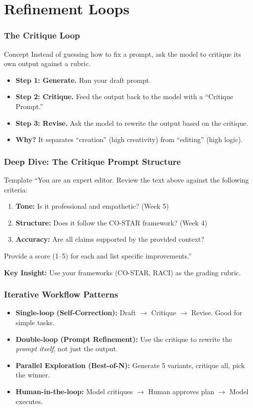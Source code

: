 \documentclass{beamer}
\begin{document}
\section{Refinement Loops}

\begin{frame}
    \frametitle{The Critique Loop}
    \begin{block}{Concept}
        Instead of guessing how to fix a prompt, ask the model to critique its own output against a rubric.
    \end{block}
    \begin{itemize}
        \item \textbf{Step 1: Generate.} Run your draft prompt.
        \item \textbf{Step 2: Critique.} Feed the output back to the model with a ``Critique Prompt.''
        \item \textbf{Step 3: Revise.} Ask the model to rewrite the output based on the critique.
        \item \textbf{Why?} It separates ``creation'' (high creativity) from ``editing'' (high logic).
    \end{itemize}
\end{frame}

\begin{frame}[fragile]
    \frametitle{Deep Dive: The Critique Prompt Structure}
    \begin{block}{Template}
        \small
        ``You are an expert editor. Review the text above against the following criteria:
        \begin{enumerate}
            \item \textbf{Tone:} Is it professional and empathetic? (Week 5)
            \item \textbf{Structure:} Does it follow the CO-STAR framework? (Week 4)
            \item \textbf{Accuracy:} Are all claims supported by the provided context?
        \end{enumerate}
        Provide a score (1--5) for each and list specific improvements.''
    \end{block}
    \vspace{0.2cm}
    \textbf{Key Insight:} Use your frameworks (CO-STAR, RACI) as the grading rubric.
\end{frame}

\begin{frame}
    \frametitle{Iterative Workflow Patterns}
    \begin{itemize}
        \item \textbf{Single-loop (Self-Correction):} Draft $\to$ Critique $\to$ Revise. Good for simple tasks.
        \item \textbf{Double-loop (Prompt Refinement):} Use the critique to rewrite the \textit{prompt itself}, not just the output.
        \item \textbf{Parallel Exploration (Best-of-N):} Generate 5 variants, critique all, pick the winner.
        \item \textbf{Human-in-the-loop:} Model critiques $\to$ Human approves plan $\to$ Model executes.
    \end{itemize}
\end{frame}
\end{document}
